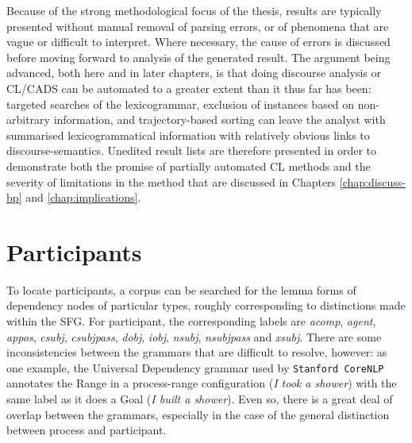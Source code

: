 Because of the strong methodological focus of the thesis, results are typically presented without manual removal of parsing errors, or of phenomena that are vague or difficult to interpret. Where necessary, the cause of errors is discussed before moving forward to analysis of the generated result. The argument being advanced, both here and in later chapters, is that doing discourse analysis or \gls{CL}\slash \gls{CADS} can be automated to a greater extent than it thus far has been: targeted searches of the \gls{lexicogrammar}, exclusion of instances based on non\hyp{}arbitrary information, and trajectory\hyp{}based sorting can leave the analyst with summarised lexicogrammatical information with relatively obvious links to \glspl{discourse-semantic}. Unedited result lists are therefore presented in order to demonstrate both the promise of partially automated \gls{CL} methods and the severity of limitations in the method that are discussed in Chapters \ref{chap:discuss-bp} and \ref{chap:implications}.

\section{Participants}

To locate participants, a \gls{corpus} can be searched for the lemma forms of dependency nodes of particular types, roughly corresponding to distinctions made within the \gls{SFG}. For participant, the corresponding labels are \emph{acomp}, \emph{agent}, \emph{appos}, \emph{csubj}, \emph{csubjpass}, \emph{dobj}, \emph{iobj}, \emph{nsubj}, \emph{nsubjpass} and \emph{xsubj}. There are some inconsistencies between the grammars that are difficult to resolve, however: as one example, the Universal Dependency grammar used by \texttt{Stanford CoreNLP} annotates the Range in a process\hyp{}range configuration (\emph{I took a shower}) with the same label as it does a Goal (\emph{I built a shower}). Even so, there is a great deal of overlap between the grammars, especially in the case of the general distinction between process and participant.

